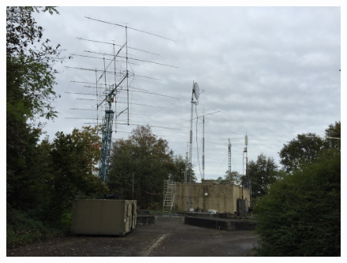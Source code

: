 \begin{frame}
  \begin{center}
    \begin{figure}
      \includegraphics[width=1\textwidth,height=.9\textheight,keepaspectratio]{bv11/IMG_2898.jpg}
    \end{figure}
  \end{center}
\end{frame}

